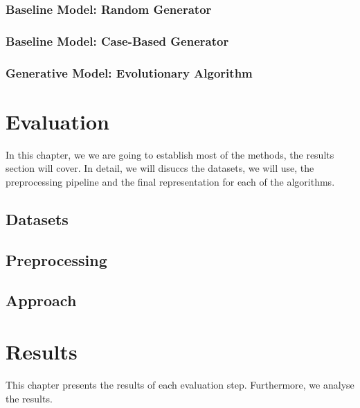 \documentclass[12pt,a4paper]{report}
\begin{document}
\subsection{Baseline Model: Random Generator}


\subsection{Baseline Model: Case-Based Generator}


\subsection{Generative Model: Evolutionary Algorithm}
\label{sec:model_evolutionary}


\chapter{Evaluation}
\label{sec:datasets}
In this chapter, we we are going to establish most of the methods, the results section will cover. In detail, we will disuccs the datasets, we will use, the preprocessing pipeline and the final representation for each of the algorithms.


\section{Datasets}
\label{sec:dataset_description}


\section{Preprocessing}
\label{sec:preprocessing}


\section{Approach}
\label{sec:experimental_setup}







\chapter{Results}
\label{sec:results}
This chapter presents the results of each evaluation step. Furthermore, we analyse the results.
\end{document}
